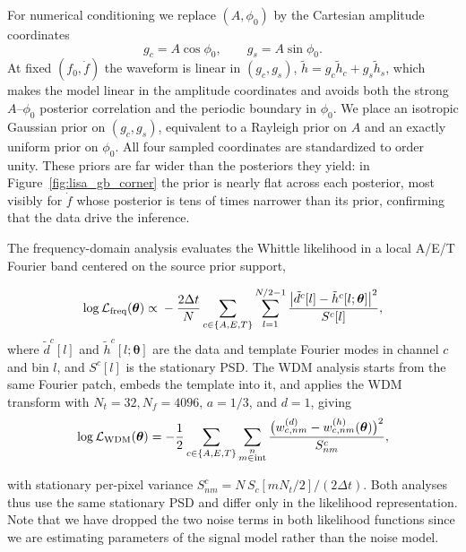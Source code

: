 \documentclass[twocolumn,preprintnumbers,
  superscriptaddress,
  nofootinbib,
  amsmath,
  amssymb,
  aps,
  prd,
  colorlinks=true,
  linkcolor=blue,
  urlcolor=blue,
  citecolor=blue,
  anchorcolor=blue
]{revtex4-2}
\begin{document}
For numerical conditioning we replace $(A,\phi_0)$ by the Cartesian amplitude coordinates
\begin{equation}
  g_c = A\cos\phi_0, \qquad g_s = A\sin\phi_0 .
  \label{eq:gc_gs}
\end{equation}
At fixed $(f_0,\dot f)$ the waveform is linear in $(g_c,g_s)$, $\tilde h = g_c\tilde h_c + g_s\tilde h_s$, which makes the model linear in the amplitude coordinates and avoids both the strong $A$--$\phi_0$ posterior correlation and the periodic boundary in $\phi_0$. We place an isotropic Gaussian prior on $(g_c,g_s)$, equivalent to a Rayleigh prior on $A$ and an exactly uniform prior on $\phi_0$. All four sampled coordinates are standardized to order unity. These priors are far wider than the posteriors they yield: in Figure~\ref{fig:lisa_gb_corner} the prior is nearly flat across each posterior, most visibly for $\dot f$ whose posterior is tens of times narrower than its prior, confirming that the data drive the inference.

The frequency-domain analysis evaluates the Whittle likelihood in a local A/E/T
Fourier band centered on the source prior support,
\begin{widetext}
\begin{equation}
  \log \mathcal{L}_{\rm freq}(\boldsymbol{\theta}) \propto {} -\frac{2\Delta t}{N}
  \sum_{c\in\{A,E,T\}} \sum_{l = 1}^{N/2 - 1}  \frac{\bigl|\tilde d^c[l]-\tilde h^c[l;\boldsymbol{\theta}]\bigr|^2}
           {S^c[l]},
\end{equation}
where $\tilde d^c[l]$ and $\tilde h^c[l;\boldsymbol{\theta}]$ are the data and
template Fourier modes in channel $c$ and bin $l$, and $S^c[l]$ is the stationary
PSD. The WDM analysis starts from the same Fourier patch, embeds the
template into it, and applies the WDM transform with $N_t=32, N_f = 4096$, $a=1/3$, and
$d=1$, giving
\begin{equation}
  \log \mathcal{L}_{\rm WDM}(\boldsymbol{\theta})
  = -\frac{1}{2}\sum_{c\in\{A,E,T\}}\sum_{\substack{n \\ m\in\mathrm{int}}}
    \frac{\bigl(w^{(d)}_{c,nm}-w^{(h)}_{c,nm}(\boldsymbol{\theta})\bigr)^2}{S^c_{nm}},
\end{equation}
\end{widetext}
with stationary per-pixel variance $S^{c}_{nm} = N\,S_c[mN_t/2]/(2\Delta t)$.
Both analyses thus use the same stationary PSD and differ only in the likelihood
representation. Note that we have dropped the two noise terms in both likelihood functions since we are estimating parameters of the signal model rather than the noise model. 
\end{document}
